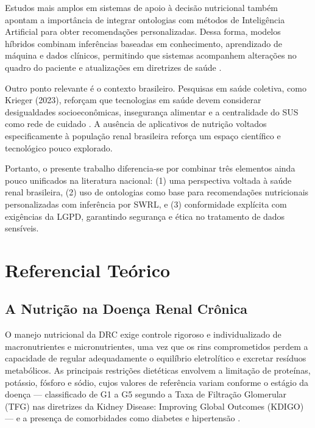 \documentclass[12pt, a4paper, twocolumn]{article}
\begin{document}
Estudos mais amplos em sistemas de apoio à decisão nutricional também apontam a importância de integrar ontologias com métodos de Inteligência Artificial para obter recomendações personalizadas. Dessa forma, modelos híbridos combinam inferências baseadas em conhecimento, aprendizado de máquina e dados clínicos, permitindo que sistemas acompanhem alterações no quadro do paciente e atualizações em diretrizes de saúde \cite{mendes2021,zhang2023}.

Outro ponto relevante é o contexto brasileiro. Pesquisas em saúde coletiva, como Krieger (2023), reforçam que tecnologias em saúde devem considerar desigualdades socioeconômicas, insegurança alimentar e a centralidade do SUS como rede de cuidado \cite{krieger2023}. A ausência de aplicativos de nutrição voltados especificamente à população renal brasileira reforça um espaço científico e tecnológico pouco explorado.

Portanto, o presente trabalho diferencia-se por combinar três elementos ainda pouco unificados na literatura nacional: (1) uma perspectiva voltada à saúde renal brasileira, (2) uso de ontologias como base para recomendações nutricionais personalizadas com inferência por SWRL, e (3) conformidade explícita com exigências da LGPD, garantindo segurança e ética no tratamento de dados sensíveis.

\section{Referencial Teórico}

    \subsection{A Nutrição na Doença Renal Crônica}

O manejo nutricional da DRC exige controle rigoroso e individualizado de macronutrientes e micronutrientes, uma vez que os rins comprometidos perdem a capacidade de regular adequadamente o equilíbrio eletrolítico e excretar resíduos metabólicos. As principais restrições dietéticas envolvem a limitação de proteínas, potássio, fósforo e sódio, cujos valores de referência variam conforme o estágio da doença --- classificado de G1 a G5 segundo a Taxa de Filtração Glomerular (TFG) nas diretrizes da Kidney Disease: Improving Global Outcomes (KDIGO) --- e a presença de comorbidades como diabetes e hipertensão \cite{vasconcelos2021,kdigo2024}.
\end{document}
